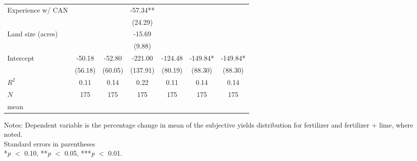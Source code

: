 \begin{table}[htbp]
\begin{threeparttable}
\begin{tabular}{l ccc ccc}
Experience w/ CAN   &               &               &      -57.34** &               &               &               \\
                    &               &               &     (24.29)   &               &               &               \\
Land size (acres)   &               &               &      -15.69   &               &               &               \\
                    &               &               &      (9.88)   &               &               &               \\
Intercept           &      -50.18   &      -52.80   &     -221.00   &     -124.48   &     -149.84*  &     -149.84*  \\
                    &     (56.18)   &     (60.05)   &    (137.91)   &     (80.19)   &     (88.30)   &     (88.30)   \\
\hline
$R^2$               &        0.11   &        0.14   &        0.22   &        0.11   &        0.14   &        0.14   \\
$N$                 &         175   &         175   &         175   &         175   &         175   &         175   \\
mean                &               &               &               &               &               &               \\
\hline
\hline
\end{tabular}
\begin{tablenotes}
\footnotesize
\item{Notes: Dependent variable is the percentage change in mean of the subjective yields distribution for fertilizer and fertilizer + lime, where noted. \\ Standard errors in parentheses \\ *\textit{p} $<$ 0.10, **\textit{p} $<$ 0.05, ***\textit{p} $<$ 0.01.}
\end{tablenotes}
\end{threeparttable}
\end{table}
